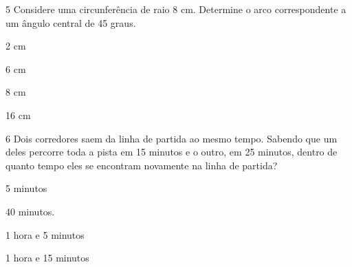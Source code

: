 
\num{5} Considere uma circunferência de raio 8 cm. Determine o arco
correspondente a um ângulo central de 45 graus.

\begin{escolha}
\item 2 cm
\item 6 cm
\item 8 cm
\item 16 cm
\end{escolha}





\num{6} Dois corredores saem da linha de partida ao mesmo tempo. Sabendo que
um deles percorre toda a pista em 15 minutos e o outro, em 25 minutos,
dentro de quanto tempo eles se encontram novamente na linha de partida?

\begin{escolha}
\item 5 minutos
\item 40 minutos.
\item 1 hora e 5 minutos
\item 1 hora e 15 minutos
\end{escolha}


